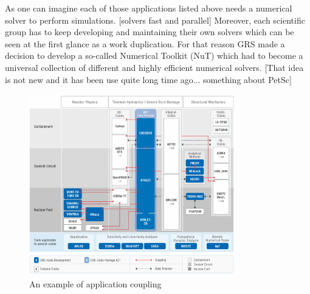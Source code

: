 As one can imagine each of those applications listed above needs a numerical solver to perform simulations. [solvers fast and parallel] Moreover, each scientific group has to keep developing and maintaining their own solvers which can be seen at the first glance as a work duplication. For that reason GRS made a decision to develop a so-called Numerical Toolkit (NuT) which had to become a universal collection of different and highly efficient numerical solvers. [That idea is not new and it has been use quite long time ago... something about PetSc]\par

\begin{figure}[htpb]
  \centering
  \includegraphics[width=0.8\textwidth]{figures/grs-application-coupling.png}
  \caption{An example of application coupling} \label{fig:applications}
\end{figure}



